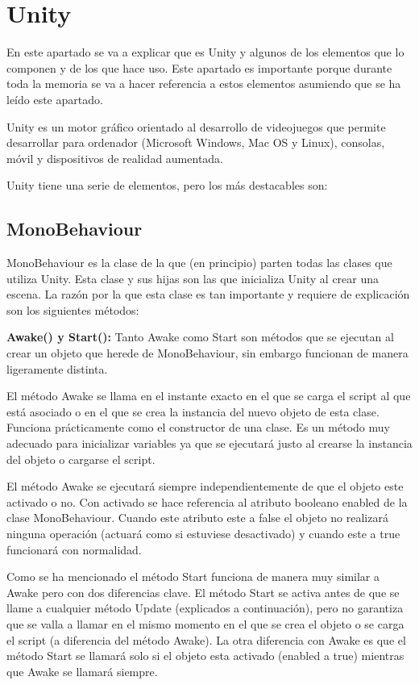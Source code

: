 
\section{Unity}
En este apartado se va a explicar que es Unity y algunos de los elementos que lo componen y de los que hace uso. Este apartado es importante porque durante toda la memoria se va a hacer referencia a estos elementos asumiendo que se ha leído este apartado.

Unity es un motor gráfico orientado al desarrollo de videojuegos que permite desarrollar para ordenador (Microsoft Windows, Mac OS y Linux), consolas, móvil y dispositivos de realidad aumentada.

Unity tiene una serie de elementos, pero los más destacables son:

\subsection{MonoBehaviour \cite{ClaseMonobehaviour}}
MonoBehaviour es la clase de la que (en principio) parten todas las clases que utiliza Unity. Esta clase y sus hijas son las que inicializa Unity al crear una escena. La razón por la que esta clase es tan importante y requiere de explicación son los siguientes métodos:

\textbf{Awake() y Start():} Tanto Awake como Start son métodos que se ejecutan al crear un objeto que herede de MonoBehaviour, sin embargo funcionan de manera ligeramente distinta. 

El método Awake se llama en el instante exacto en el que se carga el script al que está asociado o en el que se crea la instancia del nuevo objeto de esta clase. Funciona prácticamente como el constructor de una clase. Es un método muy adecuado para inicializar variables ya que se ejecutará justo al crearse la instancia del objeto o cargarse el script. 

El método Awake se ejecutará siempre independientemente de que el objeto este activado o no. Con activado se hace referencia al atributo booleano enabled de la clase MonoBehaviour. Cuando este atributo este a false el objeto no realizará ninguna operación (actuará como si estuviese desactivado) y cuando este a true funcionará con normalidad.

Como se ha mencionado el método Start funciona de manera muy similar a Awake pero con dos diferencias clave. El método Start se activa antes de que se llame a cualquier método Update (explicados a continuación), pero no garantiza que se valla a llamar en el mismo momento en el que se crea el objeto o se carga el script (a diferencia del método Awake). La otra diferencia con Awake es que el método Start se llamará solo si el objeto esta activado (enabled a true) mientras que Awake se llamará siempre.\\


